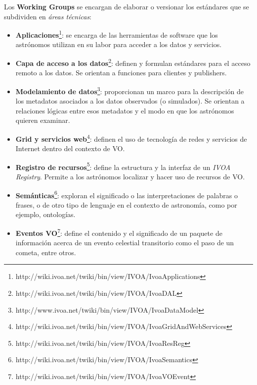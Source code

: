 Los \textbf{Working Groups} se encargan de elaborar
o versionar los estándares que se subdividen en \emph{áreas técnicas}\cite{reuna}: \\
\begin{itemize}
	\item
\textbf{Aplicaciones}\footnote{http://wiki.ivoa.net/twiki/bin/view/IVOA/IvoaApplications}:
se encarga de las herramientas de software que los astrónomos utilizan en su
labor para acceder a los datos y servicios. \\
	\item \textbf{Capa de acceso a los
datos}\footnote{http://wiki.ivoa.net/twiki/bin/view/IVOA/IvoaDAL}: definen y
formulan estándares para el acceso remoto a los datos. Se orientan a funciones
para clientes y publishers. \\
	\item \textbf{Modelamiento de
datos}\footnote{http://www.ivoa.net/twiki/bin/view/IVOA/IvoaDataModel}:
proporcionan un marco para la descripción de los metadatos asociados a los
datos observados (o simulados). Se orientan a relaciones lógicas entre esos
metadatos y el modo en que los astrónomos quieren examinar. \\
	\item \textbf{Grid y servicios
web}\footnote{http://wiki.ivoa.net/twiki/bin/view/IVOA/IvoaGridAndWebServices}:
definen el uso de tecnología de redes y servicios de Internet dentro del
contexto de VO. \\
	\item \textbf{Registro de
recursos}\footnote{http://wiki.ivoa.net/twiki/bin/view/IVOA/IvoaResReg}: define
la estructura y la interfaz de un \textit{IVOA Registry}. Permite a los
astrónomos localizar y hacer uso de recursos de VO. \\
	\item
\textbf{Semánticas}\footnote{http://wiki.ivoa.net/twiki/bin/view/IVOA/IvoaSemantics}:
exploran el significado o las interpretaciones de palabras o frases, o de otro
tipo de lenguaje en el contexto de astronomía, como por ejemplo, ontologías. \\
	\item \textbf{Eventos
VO}\footnote{http://wiki.ivoa.net/twiki/bin/view/IVOA/IvoaVOEvent}: define el
contenido y el significado de un paquete de información acerca de un evento
celestial transitorio como el paso de un cometa, entre otros. \\
\end{itemize}
